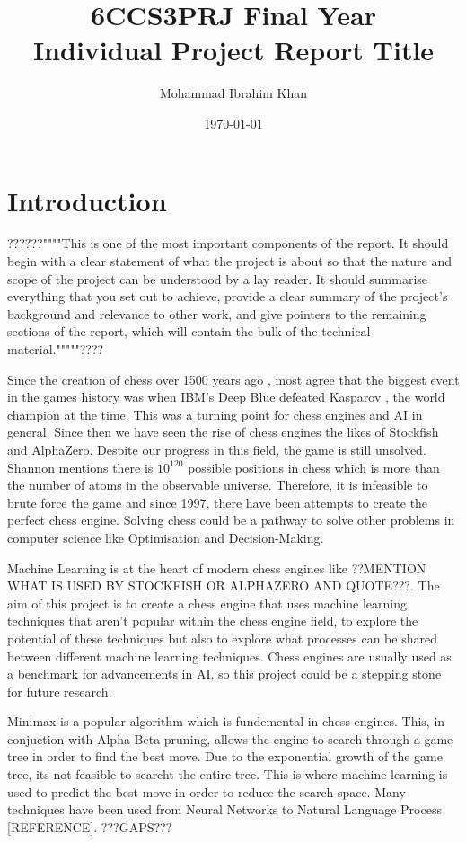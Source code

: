 \documentclass[11pt]{informatics-report}
\title{6CCS3PRJ Final Year\\\vspace{0.2cm}Individual Project Report Title}
\author{Mohammad Ibrahim Khan}
\date{\today}
\begin{document}
\createFrontMatter
\onehalfspacing
\tableofcontents
\doublespacing


\chapter{Introduction}
??????""""This is one of the most important components of the report. It should begin with a clear statement of what the project is about so that the nature and scope of the project can be understood by a lay reader. It should summarise everything that you set out to achieve, provide a clear summary of the project's background and relevance to other work, and give pointers to the remaining sections of the report, which will contain the bulk of the technical material."""""????


Since the creation of chess over 1500 years ago \cite{davidsonShortHistoryChess2012}, most agree that the biggest event in the games history was when IBM's Deep Blue defeated Kasparov \cite{hsuIBMsDeepBlue1999}, the world champion at the time. This was a turning point for chess engines and AI in general.
Since then we have seen the rise of chess engines the likes of Stockfish and AlphaZero. Despite our progress in this field, the game is still unsolved. Shannon mentions there is $10^{120}$ possible positions in chess \cite{shannonXXIIProgrammingComputer1950} which is more than the number of atoms in the observable universe. Therefore, it is infeasible to brute force the game and since 1997, there have been attempts to create the perfect chess engine. Solving chess could be a pathway to solve other problems in computer science like Optimisation
and Decision-Making. 

Machine Learning is at the heart of modern chess engines like ??MENTION WHAT IS USED BY STOCKFISH OR ALPHAZERO AND QUOTE???. The aim of this project is to create a chess engine that uses machine learning techniques that aren't popular within the chess engine field, to explore the potential of these techniques but also to explore what processes can be shared between different machine learning techniques.
Chess engines are usually used as a benchmark for advancements in AI, so this project could be a stepping stone for future research. 

Minimax is a popular algorithm which is fundemental in chess engines. This, in conjuction with Alpha-Beta pruning, allows the engine to search through a game tree in order to find the best move. Due to the exponential growth of the game tree, its not feasible to searcht the entire tree. This is where machine learning is used to predict the best move in order to reduce the search space. Many techniques have been used from Neural Networks to Natural Language Process [REFERENCE]. ???GAPS???
\end{document}

